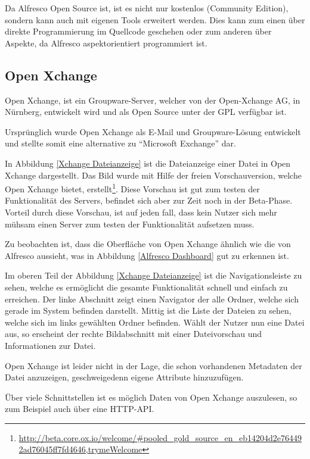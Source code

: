 Da Alfresco Open Source ist, ist es nicht nur kostenlos (Community Edition), sondern kann auch mit eigenen Tools erweitert werden. Dies kann zum einen \"uber direkte Programmierung im Quellcode geschehen oder zum anderen \"uber Aspekte, da Alfresco aspektorientiert programmiert ist. \cite{Alfresco_und_Liferay}

\subsection{Open Xchange} \label{Open Xchange}
Open Xchange, ist ein Groupware-Server, welcher von der Open-Xchange AG, in N\"urnberg, entwickelt wird und als Open Source unter der \ac{GPL} verf\"ugbar ist. \cite{Xchange_Seite} \cite{Xchange_Golem}

Urspr\"unglich wurde Open Xchange als E-Mail und Groupware-L\"osung entwickelt und stellte somit eine alternative zu "`Microsoft Exchange"' dar. \cite{Wiki_Xchange}

In Abbildung \ref{Xchange Dateianzeige} ist die Dateianzeige einer Datei in Open Xchange dargestellt. Das Bild wurde mit Hilfe der freien Vorschauversion, welche Open Xchange bietet, erstellt\footnote{\url{http://beta.core.ox.io/welcome/\#pooled\_gold\_source\_en\_eb14204d2e764492ad76045ff7fd4646,trymeWelcome}}. Diese Vorschau ist gut zum testen der Funktionalit\"at des Servers, befindet sich aber zur Zeit noch in der Beta-Phase. Vorteil durch diese Vorschau, ist auf jeden fall, dass kein Nutzer sich mehr m\"uhsam einen Server zum testen der Funktionalit\"at aufsetzen muss.

Zu beobachten ist, dass die Oberfl\"ache von Open Xchange \"ahnlich wie die von Alfresco aussieht, was in Abbildung \ref{Alfresco Dashboard} gut zu erkennen ist.

Im oberen Teil der Abbildung \ref{Xchange Dateianzeige} ist die Navigationsleiste zu sehen, welche es erm\"oglicht die gesamte Funktionalit\"at schnell und einfach zu erreichen. Der linke Abschnitt zeigt einen Navigator der alle Ordner, welche sich gerade im System befinden darstellt. Mittig ist die Liste der Dateien zu sehen, welche sich im links gew\"ahlten Ordner befinden. W\"ahlt der Nutzer nun eine Datei aus, so erscheint der rechte Bildabschnitt mit einer Dateivorschau und Informationen zur Datei.

Open Xchange ist leider nicht in der Lage, die schon vorhandenen Metadaten der Datei anzuzeigen, geschweigedenn eigene Attribute hinzuzuf\"ugen.

\"Uber viele Schnittstellen ist es m\"oglich Daten von Open Xchange auszulesen, so zum Beispiel auch \"uber eine HTTP-\ac{API}. \cite{Oxpedia_HTTP_API}

